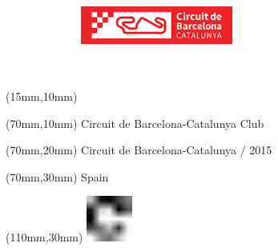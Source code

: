 \null\newpage
\begin{textblock*}{50mm}(15mm,10mm)%
\includegraphics[width=50mm]{LG/BAC.png}
\end{textblock*}
\begin{textblock*}{130mm}(70mm,10mm)%
{\fontsize{20}{20}\selectfont Circuit de Barcelona-Catalunya Club}\\
\end{textblock*}
\begin{textblock*}{120mm}(70mm,20mm)%
{\fontsize{16}{16}\selectfont Circuit de Barcelona-Catalunya / 2015}\\
\end{textblock*}
\begin{textblock*}{120mm}(70mm,30mm)%
{\fontsize{12}{12}\selectfont Spain}
\end{textblock*}
\begin{textblock*}{30mm}(110mm,30mm)%
\centering
\includegraphics[height=15mm]{icons/fa-rotate-right.pdf}
\end{textblock*}

